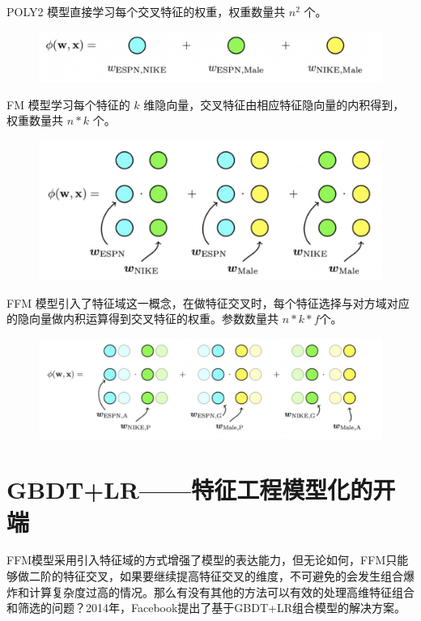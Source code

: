 \documentclass[12pt]{article}
\begin{document}
POLY2 模型直接学习每个交叉特征的权重，权重数量共 $n^2$ 个。
\begin{figure}[H]
    \centering
    \includegraphics[width=1\textwidth]{fig/CTR_Comparison_Poly2.png}
\end{figure}

FM 模型学习每个特征的 $k$ 维隐向量，交叉特征由相应特征隐向量的内积得到，权重数量共 $n*k$ 个。
\begin{figure}[H]
    \centering
    \includegraphics[width=1\textwidth]{fig/CTR_Comparison_FM.png}
\end{figure}

FFM 模型引入了特征域这一概念，在做特征交叉时，每个特征选择与对方域对应的隐向量做内积运算得到交叉特征的权重。参数数量共 $n*k*f$个。
\begin{figure}[H]
    \centering
    \includegraphics[width=1\textwidth]{fig/CTR_Comparison_FFM.png}
\end{figure}

\section{GBDT+LR——特征工程模型化的开端}
FFM模型采用引入特征域的方式增强了模型的表达能力，但无论如何，FFM只能够做二阶的特征交叉，如果要继续提高特征交叉的维度，不可避免的会发生组合爆炸和计算复杂度过高的情况。那么有没有其他的方法可以有效的处理高维特征组合和筛选的问题？2014年，Facebook提出了基于GBDT+LR组合模型的解决方案。
\end{document}
